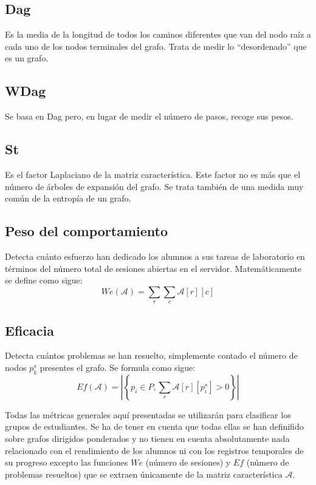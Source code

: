 \subsection{Dag}
Es la media de la longitud de todos los caminos diferentes que van del nodo raíz a cada uno de los nodos terminales del grafo. Trata de medir lo ``desordenado'' que es un grafo.
\subsection{WDag}
Se basa en Dag pero, en lugar de medir el número de pasos, recoge sus pesos.
\subsection{St}
Es el factor Laplaciano de la matriz característica. Este factor no es más que el número de árboles de expansión del grafo. Se trata también de una medida muy común de la entropía de un grafo.
\subsection{Peso del comportamiento}
Detecta cuánto esfuerzo han dedicado los alumnos a sus tareas de laboratorio en términos del número total de sesiones abiertas en el servidor. Matemáticamente se define como sigue:
\begin{equation}
We(\mathcal{A}) = \sum_r \sum_c \mathcal{A}[r][c]
\end{equation}
\subsection{Eficacia}
Detecta cuántos problemas se han resuelto, simplemente contado el número de nodos $p_k^s$ presentes el grafo. Se formula como sigue:
\begin{equation}
Ef(\mathcal{A}) = \left|\left\lbrace p_i \in P, \sum_r \mathcal{A}[r][p_i^s] > 0 \right\rbrace\right|
\end{equation}

Todas las métricas generales aquí presentadas se utilizarán para clasificar los grupos de estudiantes. Se ha de tener en cuenta que todas ellas se han definifido sobre grafos dirigidos ponderados y no tienen en cuenta absolutamente nada relacionado con el rendimiento de los alumnos ni con los registros temporales de su progreso excepto las funciones $We$ (número de sesiones) y $Ef$ (número de problemas resueltos) que se extraen únicamente de la matriz característica $\mathcal{A}$.

